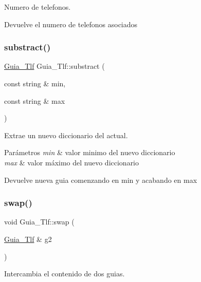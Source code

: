 Numero de telefonos. 

\begin{DoxyReturn}{Devuelve}
el numero de telefonos asociados 
\end{DoxyReturn}
\mbox{\label{classGuia__Tlf_a8018f3010c44546074b30966fbb43767}} 
\subsubsection{\texorpdfstring{substract()}{substract()}}
{\footnotesize\ttfamily \hyperlink{classGuia__Tlf}{Guia\+\_\+\+Tlf} Guia\+\_\+\+Tlf\+::substract (\begin{DoxyParamCaption}\item[{const string \&}]{min,  }\item[{const string \&}]{max }\end{DoxyParamCaption})}



Extrae un nuevo diccionario del actual. 


\begin{DoxyParams}{Parámetros}
{\em min} & valor minimo del nuevo diccionario \\
\hline
{\em max} & valor máximo del nuevo diccionario \\
\hline
\end{DoxyParams}
\begin{DoxyReturn}{Devuelve}
nueva guia comenzando en min y acabando en max 
\end{DoxyReturn}
\mbox{\label{classGuia__Tlf_a0f7d4a66893e07f44e1471e9b54fd9ee}} 
\subsubsection{\texorpdfstring{swap()}{swap()}}
{\footnotesize\ttfamily void Guia\+\_\+\+Tlf\+::swap (\begin{DoxyParamCaption}\item[{\hyperlink{classGuia__Tlf}{Guia\+\_\+\+Tlf} \&}]{g2 }\end{DoxyParamCaption})}



Intercambia el contenido de dos guias. 



